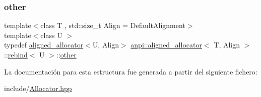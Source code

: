 \subsubsection{\texorpdfstring{other}{other}}
{\footnotesize\ttfamily template$<$class T , std\+::size\+\_\+t Align = Default\+Alignment$>$ \\
template$<$class U $>$ \\
typedef \hyperlink{classanpi_1_1aligned__allocator}{aligned\+\_\+allocator}$<$U, Align$>$ \hyperlink{classanpi_1_1aligned__allocator}{anpi\+::aligned\+\_\+allocator}$<$ T, Align $>$\+::\hyperlink{structanpi_1_1aligned__allocator_1_1rebind}{rebind}$<$ U $>$\+::\hyperlink{structanpi_1_1aligned__allocator_1_1rebind_a8f85ff3293838d8d221e946d60064eb6}{other}}



La documentación para esta estructura fue generada a partir del siguiente fichero\+:\begin{DoxyCompactItemize}
\item 
include/\hyperlink{Allocator_8hpp}{Allocator.\+hpp}\end{DoxyCompactItemize}
